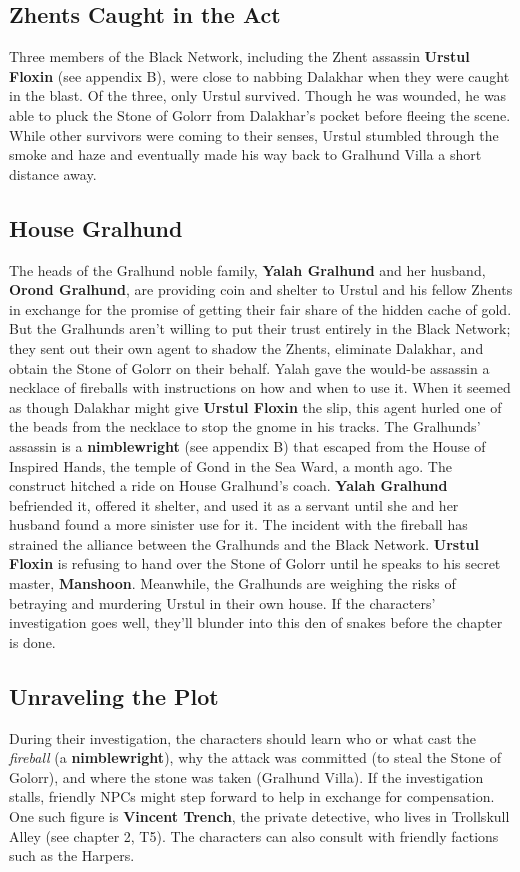 \documentclass[10pt,a4paper,twoside,twocolumn,openany,nodeprecatedcode]{dndbook}
\begin{document}
\subsection{Zhents Caught in the Act}
Three members of the Black Network, including the Zhent assassin \textbf{Urstul Floxin} (see appendix B), were close to nabbing Dalakhar when they were caught in the blast. Of the three, only Urstul survived. Though he was wounded, he was able to pluck the Stone of Golorr from Dalakhar's pocket before fleeing the scene. While other survivors were coming to their senses, Urstul stumbled through the smoke and haze and eventually made his way back to Gralhund Villa a short distance away.
\subsection{House Gralhund}
The heads of the Gralhund noble family, \textbf{Yalah Gralhund} and her husband, \textbf{Orond Gralhund}, are providing coin and shelter to Urstul and his fellow Zhents in exchange for the promise of getting their fair share of the hidden cache of gold. But the Gralhunds aren't willing to put their trust entirely in the Black Network; they sent out their own agent to shadow the Zhents, eliminate Dalakhar, and obtain the Stone of Golorr on their behalf. Yalah gave the would-be assassin a necklace of fireballs with instructions on how and when to use it. When it seemed as though Dalakhar might give \textbf{Urstul Floxin} the slip, this agent hurled one of the beads from the necklace to stop the gnome in his tracks.
The Gralhunds' assassin is a \textbf{nimblewright} (see appendix B) that escaped from the House of Inspired Hands, the temple of Gond in the Sea Ward, a month ago. The construct hitched a ride on House Gralhund's coach. \textbf{Yalah Gralhund} befriended it, offered it shelter, and used it as a servant until she and her husband found a more sinister use for it.
The incident with the fireball has strained the alliance between the Gralhunds and the Black Network. \textbf{Urstul Floxin} is refusing to hand over the Stone of Golorr until he speaks to his secret master, \textbf{Manshoon}. Meanwhile, the Gralhunds are weighing the risks of betraying and murdering Urstul in their own house. If the characters' investigation goes well, they'll blunder into this den of snakes before the chapter is done.
\subsection{Unraveling the Plot}
During their investigation, the characters should learn who or what cast the \textit{fireball} (a \textbf{nimblewright}), why the attack was committed (to steal the Stone of Golorr), and where the stone was taken (Gralhund Villa). If the investigation stalls, friendly NPCs might step forward to help in exchange for compensation. One such figure is \textbf{Vincent Trench}, the private detective, who lives in Trollskull Alley (see chapter 2, T5). The characters can also consult with friendly factions such as the Harpers.
\end{document}
